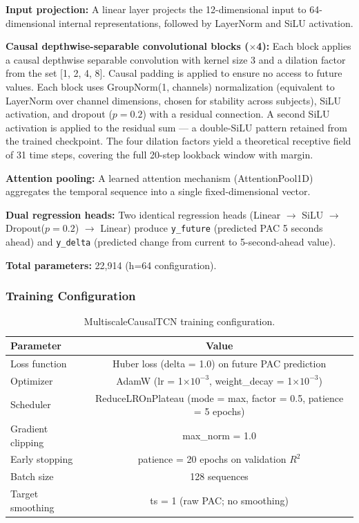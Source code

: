 \documentclass[11pt,letterpaper]{article}
\begin{document}
\textbf{Input projection:} A linear layer projects the 12-dimensional input to 64-dimensional internal representations, followed by LayerNorm and SiLU activation.

\textbf{Causal depthwise-separable convolutional blocks ($\times$4):} Each block applies a causal depthwise separable convolution with kernel size 3 and a dilation factor from the set [1, 2, 4, 8]. Causal padding is applied to ensure no access to future values. Each block uses GroupNorm(1, channels) normalization (equivalent to LayerNorm over channel dimensions, chosen for stability across subjects), SiLU activation, and dropout ($p = 0.2$) with a residual connection. A second SiLU activation is applied to the residual sum --- a double-SiLU pattern retained from the trained checkpoint. The four dilation factors yield a theoretical receptive field of 31 time steps, covering the full 20-step lookback window with margin.

\textbf{Attention pooling:} A learned attention mechanism (AttentionPool1D) aggregates the temporal sequence into a single fixed-dimensional vector.

\textbf{Dual regression heads:} Two identical regression heads (Linear $\to$ SiLU $\to$ Dropout($p = 0.2$) $\to$ Linear) produce \texttt{y\_future} (predicted PAC 5 seconds ahead) and \texttt{y\_delta} (predicted change from current to 5-second-ahead value).

\textbf{Total parameters:} 22,914 (h=64 configuration).

\subsubsection{Training Configuration}

\begin{table}[htbp]
\centering
\caption{MultiscaleCausalTCN training configuration.}
\label{tab:tcn_training}
\small
\begin{tabular}{lc}
\toprule
\textbf{Parameter} & \textbf{Value} \\
\midrule
Loss function & Huber loss (delta = 1.0) on future PAC prediction \\
Optimizer & AdamW (lr = 1$\times 10^{-3}$, weight\_decay = 1$\times 10^{-3}$) \\
Scheduler & ReduceLROnPlateau (mode = max, factor = 0.5, patience = 5 epochs) \\
Gradient clipping & max\_norm = 1.0 \\
Early stopping & patience = 20 epochs on validation $R^2$ \\
Batch size & 128 sequences \\
Target smoothing & ts = 1 (raw PAC; no smoothing) \\
\bottomrule
\end{tabular}
\end{table}
\end{document}
